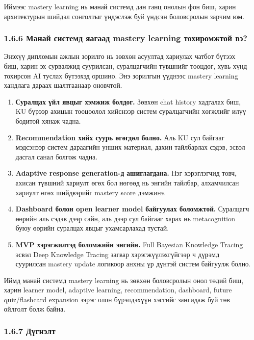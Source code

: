 \documentclass[12pt,A4]{report}
\begin{document}
Иймээс mastery learning нь манай системд дан ганц онолын фон биш, харин архитектурын шийдэл сонголтыг үндэслэж буй үндсэн боловсролын зарчим юм.

\subsubsection{1.6.6 Манай системд яагаад mastery learning тохиромжтой вэ?}

Энэхүү дипломын ажлын зорилго нь зөвхөн асуултад хариулах чатбот бүтээх биш, харин эх сурвалжид суурилсан, суралцагчийн түвшнийг тооцдог, хувь хүнд тохирсон AI туслах бүтээхэд оршино. Энэ зорилгын үүднээс mastery learning хандлага дараах шалтгаанаар оновчтой.

\begin{enumerate}
    \item \textbf{Суралцах үйл явцыг хэмжиж болдог.} Зөвхөн chat history хадгалах биш, KU бүрээр ахицын тооцоолол хийснээр систем суралцагчийн хөгжлийг илүү бодитой хянаж чадна.

    \item \textbf{Recommendation хийх суурь өгөгдөл болно.} Аль KU сул байгааг мэдсэнээр систем дараагийн унших материал, дахин тайлбарлах сэдэв, эсвэл дасгал санал болгож чадна.

    \item \textbf{Adaptive response generation-д ашиглагдана.} Нэг хэрэглэгчид товч, ахисан түвшний хариулт өгөх бол нөгөөд нь энгийн тайлбар, алхамчилсан хариулт өгөх шийдвэрийг mastery score дэмжинэ.

    \item \textbf{Dashboard болон open learner model байгуулах боломжтой.} Суралцагч өөрийн аль сэдэв дээр сайн, аль дээр сул байгааг харах нь metacognition буюу өөрийн суралцах явцыг ухамсарлахад тустай.

    \item \textbf{MVP хэрэгжилтэд боломжийн энгийн.} Full Bayesian Knowledge Tracing эсвэл Deep Knowledge Tracing загвар хэрэгжүүлэхгүйгээр ч дүрэмд суурилсан mastery update логикоор анхны үр дүнтэй систем байгуулж болно.
\end{enumerate}

Иймд манай системд mastery learning нь зөвхөн боловсролын онол төдий биш, харин learner model, adaptive learning, recommendation, dashboard, future quiz/flashcard expansion зэрэг олон бүрэлдэхүүн хэсгийг зангидаж буй төв ойлголт болж байна.

\subsubsection{1.6.7 Дүгнэлт}
\end{document}
